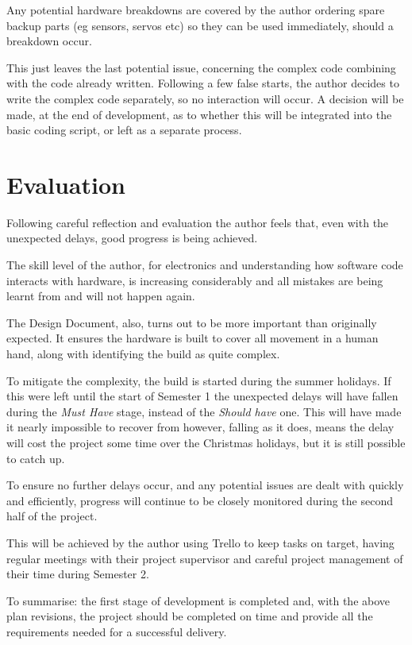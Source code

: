 \documentclass[progress]{cmpreport}
\begin{document}
{{{{{{Any potential hardware breakdowns are covered by the author ordering spare backup parts (eg sensors, servos etc) so they can be used immediately, should a breakdown occur. 

This just leaves the last potential issue, concerning the complex code combining with the code already written. Following a few false starts, the author  decides to write the complex code separately, so no interaction will occur. A decision will be made, at the end of development, as to whether this will be integrated into the basic coding script, or left as a separate process.


\section{Evaluation}
Following careful reflection and evaluation the author feels that, even with the unexpected delays, good progress is being achieved. 

The skill level of the author, for electronics and understanding how software code interacts with hardware, is increasing considerably and all mistakes are being learnt from and will not happen again.

The Design Document, also, turns out to be more important than originally expected. It ensures the hardware is built to cover all movement in a human hand, along with identifying the build as quite complex. 

To mitigate the complexity, the build is started during the summer holidays. If this were left until the start of Semester 1 the unexpected delays will have fallen during the \textit{Must Have} stage, instead of the \textit{Should have} one. This will have made it nearly impossible to recover from however, falling as it does, means the delay will cost the project some time over the Christmas holidays, but it is still possible to catch up.

To ensure no further delays occur, and any potential issues are dealt with quickly and efficiently, progress will continue to be closely monitored during the second half of the project. 

This will be achieved by the author using Trello to keep tasks on target, having regular meetings with their project supervisor and careful project management of their time during Semester 2.

To summarise: the first stage of development is completed and, with the above plan revisions, the project should be completed on time and provide all the requirements needed for a successful delivery.

}}}}}}
\end{document}
